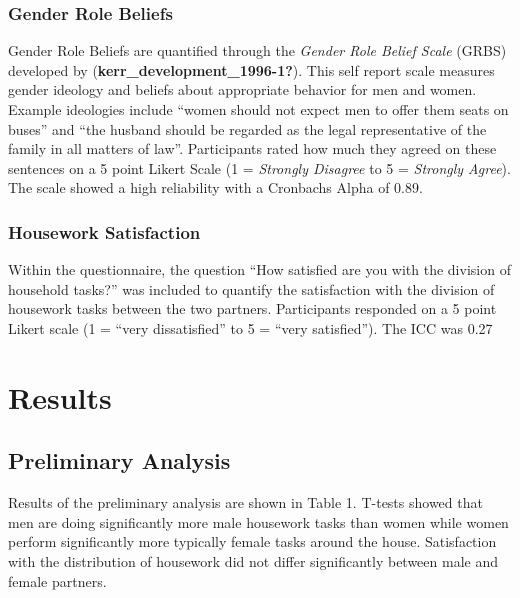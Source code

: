 \documentclass[
  man]{apa6}
\begin{document}
\hypertarget{gender-role-beliefs}{%
\subsubsection{Gender Role Beliefs}\label{gender-role-beliefs}}

Gender Role Beliefs are quantified through the \emph{Gender Role Belief Scale} (GRBS) developed by (\textbf{kerr\_development\_1996-1?}). This self report scale measures gender ideology and beliefs about appropriate behavior for men and women. Example ideologies include ``women should not expect men to offer them seats on buses'' and ``the husband should be regarded as the legal representative of the family in all matters of law''. Participants rated how much they agreed on these sentences on a 5 point Likert Scale (1 = \emph{Strongly Disagree} to 5 = \emph{Strongly Agree}). The scale showed a high reliability with a Cronbachs Alpha of 0.89.

\hypertarget{housework-satisfaction}{%
\subsubsection{Housework Satisfaction}\label{housework-satisfaction}}

Within the questionnaire, the question ``How satisfied are you with the division of household tasks?'' was included to quantify the satisfaction with the division of housework tasks between the two partners. Participants responded on a 5 point Likert scale (1 = ``very dissatisfied'' to 5 = ``very satisfied''). The ICC was 0.27

\hypertarget{results}{%
\section{Results}\label{results}}

\hypertarget{preliminary-analysis}{%
\subsection{Preliminary Analysis}\label{preliminary-analysis}}

Results of the preliminary analysis are shown in Table 1. T-tests showed that men are doing significantly more male housework tasks than women while women perform significantly more typically female tasks around the house. Satisfaction with the distribution of housework did not differ significantly between male and female partners.
\end{document}

